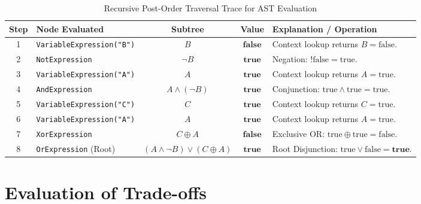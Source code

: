 \documentclass[12pt,a4paper]{article}
\begin{document}
\begin{table}[htbp]
\centering
\small
\begin{tabular}{c p{4.2cm} c c p{4.5cm}}
\toprule
\textbf{Step} & \textbf{Node Evaluated} & \textbf{Subtree} & \textbf{Value} & \textbf{Explanation / Operation} \\
\midrule
1 & \texttt{VariableExpression("B")} & $B$ & $\mathbf{false}$ & Context lookup returns $B = \text{false}$. \\
2 & \texttt{NotExpression} & $\neg B$ & $\mathbf{true}$ & Negation: $!\text{false} = \text{true}$. \\
3 & \texttt{VariableExpression("A")} & $A$ & $\mathbf{true}$ & Context lookup returns $A = \text{true}$. \\
4 & \texttt{AndExpression} & $A \land (\neg B)$ & $\mathbf{true}$ & Conjunction: $\text{true} \land \text{true} = \text{true}$. \\
5 & \texttt{VariableExpression("C")} & $C$ & $\mathbf{true}$ & Context lookup returns $C = \text{true}$. \\
6 & \texttt{VariableExpression("A")} & $A$ & $\mathbf{true}$ & Context lookup returns $A = \text{true}$. \\
7 & \texttt{XorExpression} & $C \oplus A$ & $\mathbf{false}$ & Exclusive OR: $\text{true} \oplus \text{true} = \text{false}$. \\
8 & \texttt{OrExpression} (Root) & $(A \land \neg B) \lor (C \oplus A)$ & $\mathbf{true}$ & Root Disjunction: $\text{true} \lor \text{false} = \mathbf{true}$. \\
\bottomrule
\end{tabular}
\caption{Recursive Post-Order Traversal Trace for AST Evaluation}
\label{tab:interpreter_execution_trace}
\end{table}

\newpage
\section{Evaluation of Trade-offs}
\end{document}

